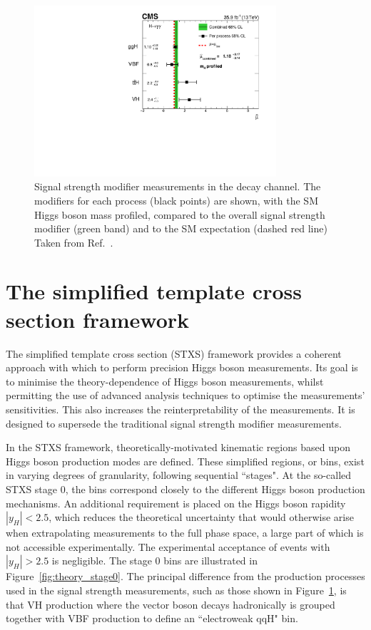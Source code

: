 \begin{figure}[hptb]
  \centering
  \includegraphics[width=0.8\textwidth]{Figures/Theory/PerProcTrad.pdf}
  \caption[Per process signal strength modifier measurements from Ref.~\cite{HIG-16-040}.]
  {
    Signal strength modifier measurements in the \Hgg decay channel.
    The modifiers for each process (black points) are shown, with the SM Higgs boson mass profiled, 
    compared to the overall signal strength modifier (green band) 
    and to the SM expectation (dashed red line)
    Taken from Ref.~\cite{HIG-16-040}.
  }
  \label{fig:theory_PerProcTrad}
\end{figure}

\section{The simplified template cross section framework}

The simplified template cross section (STXS) framework \cite{YR4}
provides a coherent approach with which to perform precision Higgs boson measurements. 
Its goal is to minimise the theory-dependence of Higgs boson measurements, 
whilst permitting the use of advanced analysis techniques to optimise the measurements' sensitivities.
This also increases the reinterpretability of the measurements.
It is designed to supersede the traditional signal strength modifier measurements.

In the STXS framework, 
theoretically-motivated kinematic regions based upon Higgs boson production modes are defined.
These simplified regions, or bins, exist in varying degrees of granularity, 
following sequential ``stages".
At the so-called STXS stage 0, 
the bins correspond closely to the different Higgs boson production mechanisms.
An additional requirement is placed on the Higgs boson rapidity $|y_H| < 2.5$, 
which reduces the theoretical uncertainty 
that would otherwise arise when extrapolating measurements to the full phase space,
a large part of which is not accessible experimentally.
The experimental acceptance of \Hgg events with $|y_H| > 2.5$ is negligible.
The stage 0 bins are illustrated in Figure~\ref{fig:theory_stage0}.
The principal difference from the production processes used in the signal strength measurements,
such as those shown in Figure~\ref{fig:theory_PerProcTrad},
is that VH production where the vector boson decays hadronically is grouped together with 
VBF production to define an ``electroweak qqH" bin.

